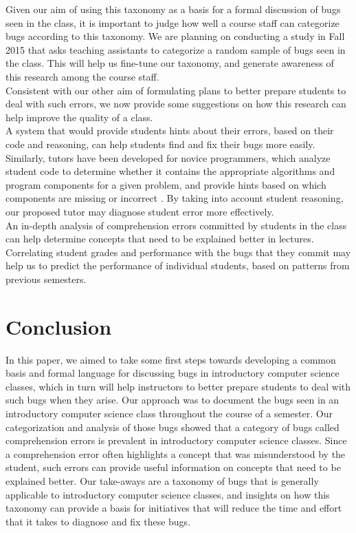 \documentclass{sig-alternate}
\begin{document}
\newpage
Given our aim of using this taxonomy as a basis for a formal
discussion of bugs seen in the class, it is important to judge how
well a course staff can categorize bugs according to this taxonomy. We
are planning on conducting a study in Fall 2015 that asks teaching
assistants to categorize a random sample of bugs seen in the class.
This will help us fine-tune our taxonomy, and generate awareness of
this research among the course staff.\\

Consistent with our other aim of formulating plans to better prepare
students to deal with such errors, we now provide some suggestions on
how this research can help improve the quality of a class.\\

A system that would provide students hints about their errors, based
on their code and reasoning, can help students find and fix their bugs
more easily. Similarly, tutors have been developed for novice
programmers, which analyze student code to determine whether it
contains the appropriate algorithms and program components for a given
problem, and provide hints based on which components are missing or
incorrect \cite{Sudol-DeLyser14}. By taking into account student
reasoning, our proposed tutor may diagnose student error more
effectively.\\

An in-depth analysis of comprehension errors committed by students in
the class can help determine concepts that need to be explained better
in lectures.\\

Correlating student grades and performance with the bugs that they
commit may help us to predict the performance of individual students,
based on patterns from previous semesters.

\section{Conclusion}

In this paper, we aimed to take some first steps towards developing a
common basis and formal language for discussing bugs in introductory
computer science classes, which in turn will help instructors to
better prepare students to deal with such bugs when they arise. Our
approach was to document the bugs seen in an introductory computer
science class throughout the course of a semester. Our categorization
and analysis of those bugs showed that a category of bugs called
comprehension errors is prevalent in introductory computer science
classes. Since a comprehension error often highlights a concept that
was misunderstood by the student, such errors can provide useful
information on concepts that need to be explained better. Our
take-aways are a taxonomy of bugs that is generally applicable to
introductory computer science classes, and insights on how this
taxonomy can provide a basis for initiatives that will reduce the time
and effort that it takes to diagnose and fix these bugs.

\newpage


\balancecolumns

\end{document}

